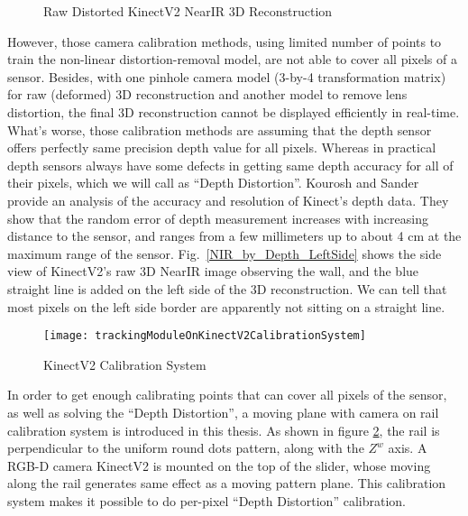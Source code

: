 %
 \begin{figure}[b]
{}
\caption{Raw Distorted KinectV2 NearIR 3D Reconstruction}
\label{NearIR}
\end{figure}%
%
However, those camera calibration methods, using limited number of points to train the non-linear distortion-removal model, are not able to cover all pixels of a sensor. Besides, with one pinhole camera model (3-by-4 transformation matrix) for raw (deformed) 3D reconstruction and another model to remove lens distortion, the final 3D reconstruction cannot be displayed efficiently in real-time. What's worse, those calibration methods are assuming that the depth sensor offers perfectly same precision depth value for all pixels. Whereas in practical depth sensors always have some defects in getting same depth accuracy for all of their pixels, which we will call as \enquote{Depth Distortion}. Kourosh and Sander \cite{KinectAccuracy_2012} provide an analysis of the accuracy and resolution of Kinect's depth data. They show that the random error of depth measurement increases with increasing distance to the sensor, and ranges from a few millimeters up to about 4 cm at the maximum range of the sensor. Fig.~\ref{NIR_by_Depth_LeftSide} shows the side view of KinectV2's raw 3D NearIR image observing the wall, and the blue straight line is added on the left side of the 3D reconstruction. We can tell that most pixels on the left side border are apparently not sitting on a straight line.%
\\\indent
%
\begin{figure}[t]
\centering
\texttt{[image: trackingModuleOnKinectV2CalibrationSystem]}
\caption{KinectV2 Calibration System}
\label{trackingModuleOnKinectV2CalibrationSystem}
\end{figure}%
%
In order to get enough calibrating points that can cover all pixels of the sensor, as well as solving the \enquote{Depth Distortion}, a moving plane with camera on rail calibration system is introduced in this thesis. As shown in figure \ref{trackingModuleOnKinectV2CalibrationSystem}, the rail is perpendicular to the uniform round dots pattern, along with the \(Z^{w}\) axis. A RGB-D camera KinectV2 is mounted on the top of the slider, whose moving along the rail generates same effect as a moving pattern plane. This calibration system makes it possible to do per-pixel \enquote{Depth Distortion} calibration.%
%
%
